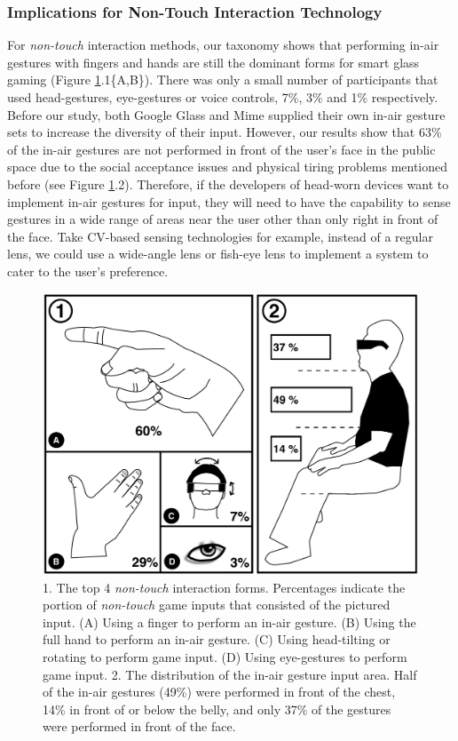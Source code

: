 \documentclass{sigchi}
\begin{document}
    \subsubsection{Implications for Non-Touch Interaction Technology}
    For \emph{non-touch} interaction methods, our taxonomy shows that performing in-air gestures with fingers and hands are still the dominant forms for smart glass gaming (Figure \ref{fig:figureInAirPorpotion}.1\{A,B\}). There was only a small number of participants that used head-gestures, eye-gestures or voice controls, 7\%, 3\% and 1\% respectively.
    Before our study, both Google Glass and Mime\cite{GoogleGlass, Colaco:2013:MCL:2501988.2502042} supplied their own in-air gesture sets to increase the diversity of their input. However, our results show that 63\% of the in-air gestures are not performed in front of the user's face in the public space due to the social acceptance issues and physical tiring problems mentioned before (see Figure \ref{fig:figureInAirPorpotion}.2). Therefore, if the developers of head-worn devices want to implement in-air gestures for input, they will need to have the capability to sense gestures in a wide range of areas near the user other than only right in front of the face. Take CV-based sensing technologies for example, instead of a regular lens, we could use a wide-angle lens or fish-eye lens to implement a system to cater to the user's preference.   
  \begin{figure}[!h]
  \centering
  \includegraphics[width=0.8\columnwidth]{InAirControlArea.pdf}
  \caption{1. The top 4 \emph{non-touch} interaction forms. Percentages indicate the portion of \emph{non-touch} game inputs that consisted of the pictured input. (A) Using a finger to perform an in-air gesture. (B) Using the full hand to perform an in-air gesture. (C) Using head-tilting or rotating to perform game input. (D) Using eye-gestures to perform game input. 2. The distribution of the in-air gesture input area. Half of the in-air gestures (49\%) were performed in front of the chest, 14\% in front of or below the belly, and only 37\% of the gestures were performed in front of the face.}
  \label{fig:figureInAirPorpotion}
  \end{figure}
\end{document}
